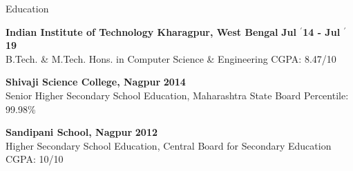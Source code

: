 \documentclass{resume} %
\begin{document}

\begin{rSection}{Education}

{\bf \large Indian Institute of Technology Kharagpur, West Bengal} \hfill \textbf{Jul $^{\prime}$14 - Jul $^{\prime}$19} \\ 
B.Tech. \& M.Tech. Hons. in Computer Science \& Engineering \hfill CGPA: 8.47/10\\
\vspace{-1.5em}

{\bf \large Shivaji Science College, Nagpur} \hfill \textbf{2014} \\ 
Senior Higher Secondary School Education, Maharashtra State Board \hfill  Percentile: 99.98\% \\
\vspace{-1.5em}

{\bf \large Sandipani School, Nagpur} \hfill \textbf{2012} \\ 
Higher Secondary School Education, Central Board for Secondary Education \hfill CGPA: 10/10\\
\vspace{-1.5em}

\end{rSection}
\end{document}
